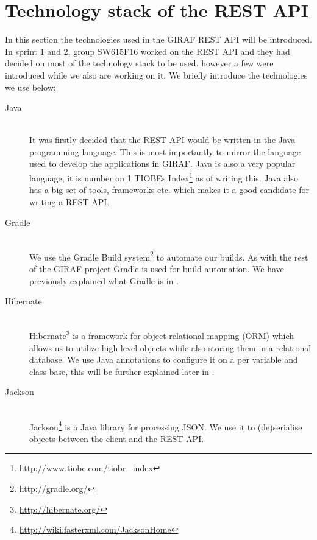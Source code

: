 

\section{Technology stack of the REST API}\label{sec:techstack}
In this section the technologies used in the GIRAF REST API will be introduced.
In sprint 1 and 2, group SW615F16 worked on the REST API and they had decided on most of the technology stack to be used, however a few were introduced while we also are working on it. 
We briefly introduce the technologies we use below:
\begin{description}
    \item[Java] \hfill \\
        It was firstly decided that the REST API would be written in the Java programming language.
        This is most importantly to mirror the language used to develop the applications in GIRAF.
        Java is also a very popular language, it is number on 1 TIOBEs Index\footnote{\url{http://www.tiobe.com/tiobe_index}} as of writing this. 
        Java also has a big set of tools, frameworks etc. which makes it a good candidate for writing a REST API.

    \item[Gradle] \hfill \\
        We use the Gradle Build system\footnote{\url{http://gradle.org/}} to automate our builds. 
        As with the rest of the GIRAF project Gradle is used for build automation. 
        We have previously explained what Gradle is in .

    \item[Hibernate] \hfill \\
        Hibernate\footnote{\url{http://hibernate.org/}} is a framework for object-relational mapping (ORM) which allows us to utilize high level objects while also storing them in a relational database. 
        We use Java annotations to configure it on a per variable and class base, this will be further explained later in .

    \item[Jackson] \hfill \\
        Jackson\footnote{\url{http://wiki.fasterxml.com/JacksonHome}} is a Java library for processing JSON.
        We use it to (de)serialise objects between the client and the REST API. 


\end{description}
